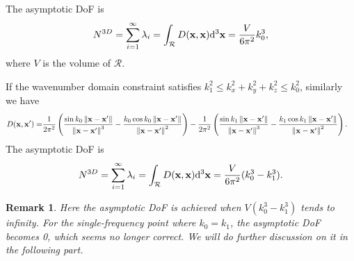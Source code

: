 \documentclass[12pt,draftclsnofoot,journal,onecolumn]{IEEEtran}
\newtheorem{remark}{Remark}
\begin{document}
	The asymptotic DoF is 
	\begin{equation}
		\begin{aligned}
			N^{3D} = \sum_{i=1}^\infty \lambda_i = \int_{\mathcal{R}}D({\bf x},{\bf x}){\rm d}^3{\bf x} = \frac{V}{6\pi^2}k_0^3,
		\end{aligned}
	\end{equation}
	{\color{red} where $V$ is the volume of $\mathcal{R}$.}
	
	If the wavenumber domain constraint satisfies $k_1^2\leqslant k_x^2+k_y^2+k_z^2 \leqslant k_0^2$, similarly we have
	\begin{equation}
		\begin{aligned}
			D({\bf x},{\bf x}') =& \frac{1}{2\pi^2} \left( \frac{\sin k_0\left\| {\bf x}-{\bf x}' \right\|}{\left\| {\bf x}-{\bf x}' \right\|^3}-\frac{k_0\cos k_0\left\| {\bf x}-{\bf x}' \right\|}{\left\| {\bf x}-{\bf x}' \right\|^2} \right)
	-\frac{1}{2\pi^2} \left( \frac{\sin k_1\left\| {\bf x}-{\bf x}' \right\|}{\left\| {\bf x}-{\bf x}' \right\|^3}-\frac{k_1\cos k_1\left\| {\bf x}-{\bf x}' \right\|}{\left\| {\bf x}-{\bf x}' \right\|^2} \right).
		\end{aligned}
		\label{equ_spherical_shell}
	\end{equation}
	The asymptotic DoF is 
	\begin{equation}
	\begin{aligned}
		N^{3D} = \sum_{i=1}^\infty \lambda_i = \int_{\mathcal{R}}D({\bf x},{\bf x}){\rm d}^3{\bf x} = \frac{V}{6\pi^2}(k_0^3-k_1^3).
	\end{aligned}
	\end{equation}
	\begin{remark}
		Here the asymptotic DoF is achieved when $V(k_0^3-k_1^3)$ tends to infinity. For the single-frequency point where $k_0=k_1$, the asymptotic DoF becomes 0, which seems no longer correct. We will do further discussion on it in the following part. 
		\end{remark}
	
\end{document}
